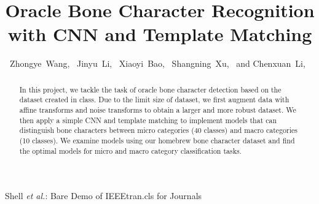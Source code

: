 \documentclass[journal]{IEEEtran}
\begin{document}
%
\title{Oracle Bone Character Recognition\\ with CNN and Template Matching}
%
%
%

\author{
	Zhongye~Wang,~
	Jinyu~Li,~
	Xiaoyi~Bao,~
	Shangning~Xu,~
	and Chenxuan~Li,~
}

%
{Shell \MakeLowercase{\textit{et al.}}: Bare Demo of IEEEtran.cls for Journals}
%


\maketitle

\begin{abstract}
	In this project, we tackle the task of oracle bone character detection based on the dataset created in class.
	Due to the limit size of dataset, we first augment data with affine transforms and noise transforms to obtain a larger and more robust dataset.
	We then apply a simple CNN and template matching to implement models that can distinguish bone characters between micro categories (40 classes) and macro categories (10 classes).
	We examine models using our homebrew bone character dataset and find the optimal models for micro and macro category classification tasks.
\end{abstract}
\end{document}
